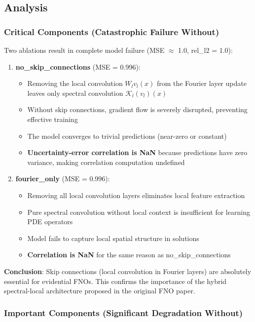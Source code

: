 \subsection{Analysis}

\subsubsection{Critical Components (Catastrophic Failure Without)}

Two ablations result in complete model failure (MSE $\approx$ 1.0, rel\_l2 = 1.0):

\begin{enumerate}
\item \textbf{no\_skip\_connections} (MSE = 0.996):
\begin{itemize}
\item Removing the local convolution $W_l v_l(x)$ from the Fourier layer update leaves only spectral convolution $\mathcal{K}_l(v_l)(x)$
\item Without skip connections, gradient flow is severely disrupted, preventing effective training
\item The model converges to trivial predictions (near-zero or constant)
\item \textbf{Uncertainty-error correlation is NaN} because predictions have zero variance, making correlation computation undefined
\end{itemize}

\item \textbf{fourier\_only} (MSE = 0.996):
\begin{itemize}
\item Removing all local convolution layers eliminates local feature extraction
\item Pure spectral convolution without local context is insufficient for learning PDE operators
\item Model fails to capture local spatial structure in solutions
\item \textbf{Correlation is NaN} for the same reason as no\_skip\_connections
\end{itemize}
\end{enumerate}

\textbf{Conclusion}: Skip connections (local convolution in Fourier layers) are absolutely essential for evidential FNOs. This confirms the importance of the hybrid spectral-local architecture proposed in the original FNO paper.

\subsubsection{Important Components (Significant Degradation Without)}

